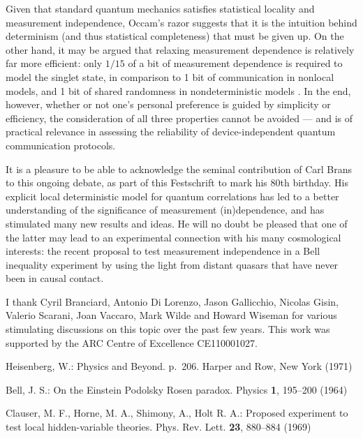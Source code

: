 \documentclass[graybox]{svmult}
\begin{document}
{Given that standard quantum mechanics satisfies statistical locality and measurement independence, Occam's razor suggests that it is the intuition behind determinism (and thus statistical completeness) that must be given up.  On the other hand, it may be argued that relaxing  measurement dependence is relatively far more efficient: only $1/15$ of a bit of measurement dependence is required to model the singlet state, in comparison to 1 bit of communication in nonlocal models, and 1 bit of shared randomness in nondeterministic models \cite{relaxed}. In the end, however, whether or not one's personal preference is guided by simplicity or efficiency, the consideration of all three properties cannot be avoided --- and is of practical relevance in assessing the reliability of device-independent quantum communication protocols. 

It is a pleasure to be able to acknowledge the seminal contribution of Carl Brans to this ongoing debate, as part of this Festschrift to mark his 80th birthday.  His explicit local deterministic model for quantum correlations has led to a better understanding of the significance of measurement (in)dependence, and has stimulated many new results and ideas. He will no doubt be pleased that one of the latter \cite{jason} may lead to an experimental connection with his many cosmological interests: the recent proposal to test measurement independence in a Bell inequality experiment by using the light from distant quasars that have never been in causal contact. 
 


\begin{acknowledgement}
	I thank  Cyril Branciard, Antonio Di Lorenzo, Jason Gallicchio, Nicolas Gisin, Valerio Scarani, Joan Vaccaro, Mark Wilde and Howard Wiseman for various stimulating discussions on this topic over the past few years. This work was supported by the ARC Centre of Excellence CE110001027.
\end{acknowledgement}


\begin{thebibliography}{99}

		
 Heisenberg, W.: Physics and Beyond. p.~206. Harper and Row, New York
(1971)

 Bell, J. S.: On the Einstein Podolsky Rosen paradox. Physics {\bf 1}, 195--200 (1964)


 Clauser, M. F., Horne, M. A., Shimony, A., Holt R. A.: Proposed experiment to test local hidden-variable theories. Phys. Rev. Lett. {\bf 23}, 880--884 (1969)


\end{thebibliography}}
\end{document}
